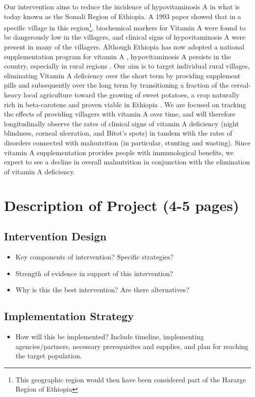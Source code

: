 \documentclass[12pt, letterpaper, draft]{article}
\begin{document}
Our intervention aims to reduce the incidence of hypovitaminosis A in what is today known as the Somali Region of Ethiopia. A 1993 paper \cite{wolde1993severe} showed that in a specific village in this region\footnote{This geographic region would then have been considered part of the Hararge Region of Ethiopia}, biochemical markers for Vitamin A were found to be dangerously low in the villagers, and clinical signs of hypovitaminosis A were present in many of the villagers. Although Ethiopia has now adopted a national supplementation program for vitamin A \cite{semba2008coverage}, hypovitaminosis A persists in the country, especially in rural regions \cite{demissie2010magnitude}. Our aim is to target individual rural villages, eliminating Vitamin A deficiency over the short term by providing supplement pills and subsequently over the long term by transitioning a fraction of the cereal-heavy local agriculture toward the growing of sweet potatoes, a crop naturally rich in beta-carotene and proven viable in Ethiopia \cite{belehu2003agronomical}. We are focused on tracking the effects of providing villagers with vitamin A over time, and will therefore longitudinally observe the rates of clinical signs of vitamin A deficiency (night blindness, corneal ulceration, and Bitot's spots) in tandem with the rates of disorders connected with malnutrition (in particular, stunting and wasting). Since vitamin A supplementation provides people with immunological benefits, we expect to see a decline in overall malnutrition in conjunction with the elimination of vitamin A deficiency.

\section{Description of Project (4-5 pages)}
\subsection{Intervention Design}
\begin{itemize}
    \item Key components of intervention? Specific strategies?
    \item Strength of evidence in support of this intervention?
    \item Why is this the best intervention? Are there alternatives?
\end{itemize}
\subsection{Implementation Strategy}
\begin{itemize}
    \item How will this be implemented? Include timeline, implementing agencies/partners,
    necessary prerequisites and supplies, and plan for reaching the target population.
\end{itemize}
\end{document}

